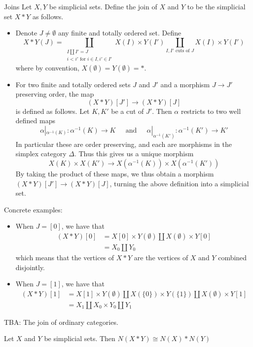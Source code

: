 \documentclass[a4paper]{article}
\begin{document}
\begin{defn}{Joins}{} Let $X,Y$ be simplicial sets. Define the join of $X$ and $Y$ to be the simplicial set $X\ast Y$ as follows. 
\begin{itemize}
\item Denote $J\neq\emptyset$ any finite and totally ordered set. Define $$X\ast Y(J)=\coprod_{\substack{I\amalg I'=J\\i<i'\text{ for }i\in I,i'\in I'}}X(I)\times Y(I')\coprod_{I,I'\text{ cuts of }J}X(I)\times Y(I')$$ where by convention, $X(\emptyset)=Y(\emptyset)=\ast$. 
\item For two finite and totally ordered sets $J$ and $J'$ and a morphism $J\to J'$ preserving order, the map $$(X\ast Y)[J']\to(X\ast Y)[J]$$ is defined as follows. Let $K,K'$ be a cut of $J'$. Then $\alpha$ restricts to two well defined maps $$\alpha|_{\alpha^{-1}(K)}:\alpha^{-1}(K)\to K\;\;\;\;\text{ and }\;\;\;\;\alpha|_{\alpha^{-1}(K')}:\alpha^{-1}(K')\to K'$$ In particular these are order preserving, and each are morphisms in the simplex category $\Delta$. Thus this gives us a unique morphism $$X(K)\times X(K')\to X(\alpha^{-1}(K))\times X(\alpha^{-1}(K'))$$ By taking the product of these maps, we thus obtain a morphism $(X\ast Y)[J']\to(X\ast Y)[J]$, turning the above definition into a simplicial set. 
\end{itemize}
\end{defn}

Concrete examples: 
\begin{itemize}
\item When $J=[0]$, we have that 
\begin{align*}
(X\ast Y)[0]&=X[0]\times Y(\emptyset)\amalg X(\emptyset)\times Y[0]\\
&=X_0\amalg Y_0
\end{align*}
which means that the vertices of $X\ast Y$ are the vertices of $X$ and $Y$ combined disjointly. 
\item When $J=[1]$, we have that 
\begin{align*}
(X\ast Y)[1]&=X[1]\times Y(\emptyset)\amalg X(\{0\})\times Y(\{1\}) \amalg X(\emptyset)\times Y[1]\\
&=X_1\amalg X_0\times Y_0\amalg Y_1
\end{align*}
\end{itemize}

TBA: The join of ordinary categories. 

\begin{lmm}{}{} Let $X$ and $Y$ be simplicial sets. Then $N(X\ast Y)\cong N(X)\ast N(Y)$
\end{lmm}
\end{document}
